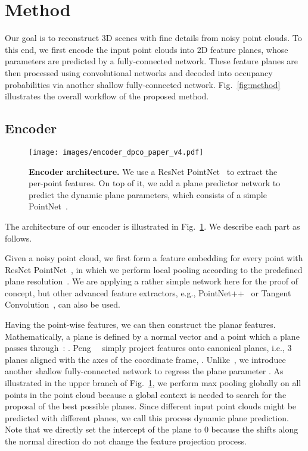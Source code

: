 \documentclass[10pt,twocolumn,letterpaper]{article}
\newcommand{\boldparagraph}[1]{\vspace{0.2cm}\noindent{\bf #1:} }
\begin{document}
\section{Method}\label{sec:method}

Our goal is to reconstruct 3D scenes with fine details from noisy point clouds. To this end, we first encode the input point clouds into 2D feature planes, whose parameters are predicted by a fully-connected network. These feature planes are then processed using convolutional networks and decoded into occupancy probabilities via another shallow fully-connected network. Fig.~\ref{fig:method} illustrates the overall workflow of the proposed method.


\subsection{Encoder}

\begin{figure}[!ht]
\centering
\texttt{[image: images/encoder\_dpco\_paper\_v4.pdf]}
\caption{\textbf{Encoder architecture.} We use a ResNet PointNet~\cite{mescheder2018occupancy,peng2020convolutional} to extract the per-point features. On top of it, we add a plane predictor network to predict the dynamic plane parameters, which consists of a simple PointNet~\cite{pointnet}.}
\label{fig:encoder}
\end{figure}

The architecture of our encoder is illustrated in Fig.~\ref{fig:encoder}. We describe each part as follows.

\boldparagraph{Point cloud encoding}
Given a noisy point cloud, we first form a feature embedding for every point with ResNet PointNet~\cite{mescheder2018occupancy}, in which we perform local pooling according to the predefined plane resolution~\cite{peng2020convolutional}.
We are applying a rather simple network here for the proof of concept, but other advanced feature extractors, e.g., PointNet++~\cite{pointnet++} or Tangent Convolution~\cite{tatarchenko2018tangent}, can also be used. 
 
\boldparagraph{Dynamic plane prediction}
Having the point-wise features, we can then construct the planar features.
Mathematically, a plane is defined by a normal vector  and a point  which a plane passes through~\cite{point-planenet}: .
Peng~\etal~\cite{peng2020convolutional} simply project features onto canonical planes, i.e., 3 planes aligned with the axes of the coordinate frame, . 
Unlike~\cite{peng2020convolutional}, we introduce another shallow fully-connected network to regress the plane parameter .
As illustrated in the upper branch of Fig.~\ref{fig:encoder}, we perform max pooling globally on all points in the point cloud because a global context is needed to search for the proposal of the best possible planes.
Since different input point clouds might be predicted with different planes, we call this process dynamic plane prediction.
Note that we directly set the intercept of the plane  to 0 because the shifts along the normal direction do not change the feature projection process.
\end{document}
